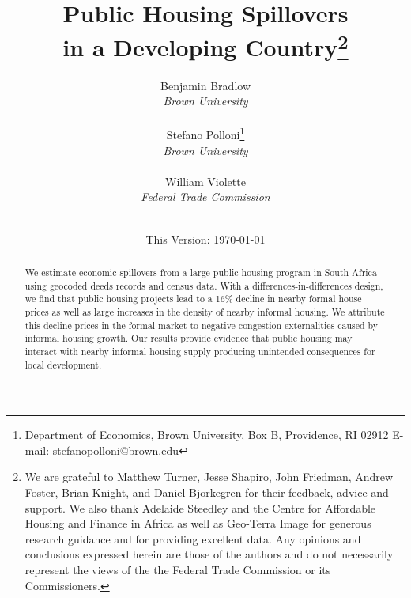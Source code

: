 \documentclass[12pt]{article}
\begin{document}
\begin{titlepage}
\title{Public Housing Spillovers \\ in a Developing Country\thanks{We are grateful to Matthew Turner, Jesse Shapiro, John Friedman, Andrew Foster, Brian Knight, and Daniel Bjorkegren for their feedback, advice and support.  We also thank Adelaide Steedley and the Centre for Affordable Housing and Finance in Africa as well as Geo-Terra Image for generous research guidance and for providing excellent data.  Any opinions and conclusions expressed herein are those of the authors and do not necessarily represent the views of the the Federal Trade Commission or its Commissioners.}}
\vspace{2mm}
\author{Benjamin Bradlow\\[-0.4em] \normalsize{\it Brown University}\\
 \\ 
 Stefano Polloni\thanks{Department of Economics, Brown University, Box B, Providence, RI 02912  E-mail: stefano\textunderscore polloni@brown.edu}\\[-0.4em] \normalsize{\it Brown University}\\ 
 \\
  William Violette \\[-0.4em] \normalsize{\it Federal Trade Commission}\\
 \\ 
  }
\vspace{30mm}
\date{\vspace{5mm}This Version: \today}
\maketitle
\begin{abstract}
 We estimate economic spillovers from a large public housing program in South Africa using geocoded deeds records and census data.  With a differences-in-differences design, we find that public housing projects lead to a 16\% decline in nearby formal house prices as well as large increases in the density of nearby informal housing.  We attribute this decline prices in the formal market to negative congestion externalities caused by informal housing growth.  Our results provide evidence that public housing may interact with nearby informal housing supply producing unintended consequences for local development.
\bigskip
\end{abstract}
\setcounter{page}{0}
\thispagestyle{empty}
\end{titlepage}
\pagebreak \newpage
\end{document}
